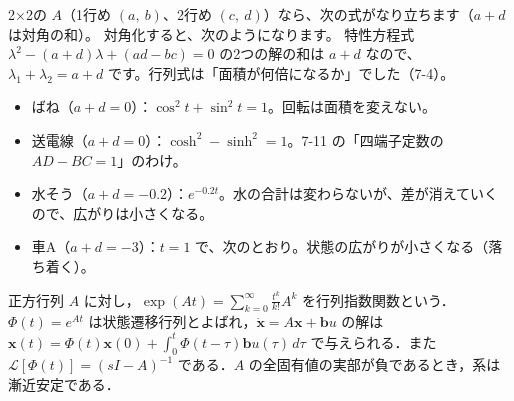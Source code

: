 \begin{motto}[5]
2×2の $A$（1行め $(a,\ b)$、2行め $(c,\ d)$）なら、次の式がなり立ちます（$a+d$ は対角の和）。
対角化すると、次のようになります。
特性方程式 $\lambda^2-(a+d)\lambda+(ad-bc)=0$ の2つの解の和は $a+d$ なので、$\lambda_1+\lambda_2=a+d$ です。行列式は「面積が何倍になるか」でした（7-4）。
\begin{itemize}[leftmargin=1.2\zw, itemsep=1pt, topsep=1pt, label={\color{\bkTT}●}]
\item ばね（$a+d=0$）：$\cos^2t+\sin^2t=1$。回転は面積を変えない。
\item 送電線（$a+d=0$）：$\cosh^2-\sinh^2=1$。7-11 の「四端子定数の $AD-BC=1$」のわけ。
\item 水そう（$a+d=-0.2$）：$e^{-0.2t}$。水の合計は変わらないが、差が消えていくので、広がりは小さくなる。
\item 車A（$a+d=-3$）：$t=1$ で、次のとおり。状態の広がりが小さくなる（落ち着く）。
\end{itemize}
\end{motto}

\begin{senmonsho}
\begin{bkhonbun}
正方行列 $A$ に対し，$\exp(At)=\displaystyle\sum_{k=0}^{\infty}\frac{t^k}{k!}A^k$ を行列指数関数という．$\Phi(t)=e^{At}$ は状態遷移行列とよばれ，$\dot{\symbf{x}}=A\symbf{x}+\symbf{b}u$ の解は $\symbf{x}(t)=\Phi(t)\symbf{x}(0)+\displaystyle\int_0^t\Phi(t-\tau)\symbf{b}u(\tau)\,d\tau$ で与えられる．また $\mathcal{L}[\Phi(t)]=(sI-A)^{-1}$ である．$A$ の全固有値の実部が負であるとき，系は漸近安定である．
\end{bkhonbun}
\end{senmonsho}



\begin{kotoba}
\small
{}
\end{kotoba}

